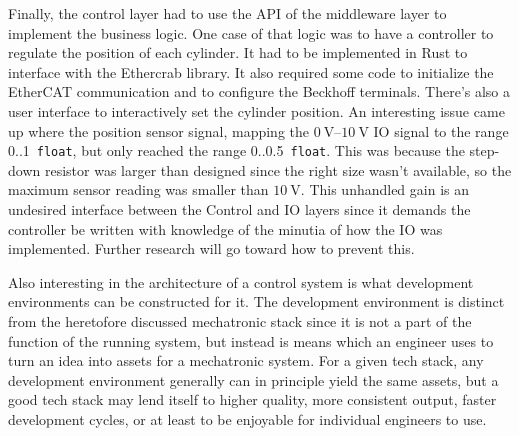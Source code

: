 \documentclass[english,12pt,a4paper,pdftex,eng,utf8]{aaltothesis}
\begin{document}
Finally, the control layer had to use the API of the middleware layer to implement the business logic. One case of that logic was to have a controller to regulate the position of each cylinder. It had to be implemented in Rust to interface with the Ethercrab library. It also required some code to initialize the EtherCAT communication and to configure the Beckhoff terminals. There's also a user interface to interactively set the cylinder position. An interesting issue came up where the position sensor signal, mapping the $\qtyrange[range-units=single,range-phrase=..]{0}{10}{\volt}$ IO signal to the range 0..1~\verb|float|, but only reached the range 0..0.5~\verb|float|. This was because the step-down resistor was larger than designed since the right size wasn't available, so the maximum sensor reading was smaller than $\qty{10}{\volt}$. This unhandled gain is an undesired interface between the Control and IO layers since it demands the controller be written with knowledge of the minutia of how the IO was implemented. Further research will go toward how to prevent this.

Also interesting in the architecture of a control system is what development environments can be constructed for it.  The development environment is distinct from the heretofore discussed mechatronic stack since it is not a part of the function of the running system, but instead is means which an engineer uses to turn an idea into assets for a mechatronic system.  For a given tech stack, any development environment generally can in principle yield the same assets, but a good tech stack may lend itself to higher quality, more consistent output, faster development cycles, or at least to be enjoyable for individual engineers to use.
\end{document}
